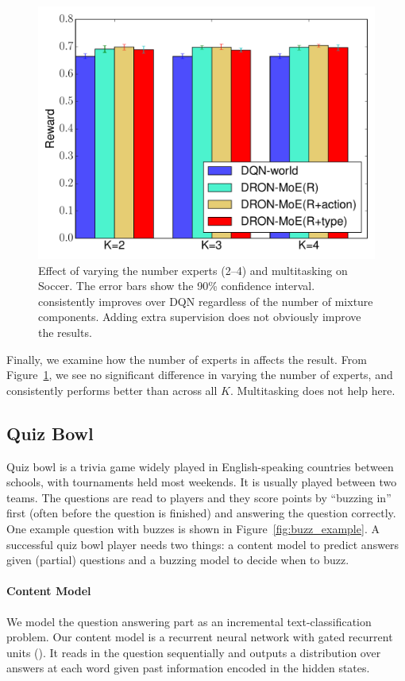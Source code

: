 \begin{figure}[t]
\centering
\includegraphics[width=0.6\linewidth]{2016_icml_opponent/figures/soccer_moe_bar}
\caption{Effect of varying the number experts (2--4) and multitasking on Soccer.
The error bars show the 90\% confidence interval.
\dronmoe{} consistently improves over DQN regardless of the number of mixture components.
Adding extra supervision does not obviously improve the results.
}
\label{fig:soccer_moe_bar}
\end{figure}

Finally, we examine how the number of experts in \dronmoe{} affects
the result. From Figure~\ref{fig:soccer_moe_bar}, we see no
significant difference in varying the number of experts, and
\dronmoe{} consistently performs better than \dqn{} across all $K$.
Multitasking does not help here.

\subsection{Quiz Bowl}

Quiz bowl is a trivia game widely played in English-speaking countries between
schools, with tournaments held most
weekends. It is usually played between two
teams.  The questions are read to players and they score points by ``buzzing in''
first (often before the question is finished) and answering the question
correctly.
One example question with buzzes is shown in Figure~\ref{fig:buzz_example}.
A successful quiz bowl player needs two things: a content
model to predict answers given (partial) questions and a buzzing model to decide
when to buzz.

\paragraph{Content Model}

We model the question answering part as an incremental text-classification
problem.  Our content model is a recurrent neural network with gated recurrent
units (\gru{}).  It reads in the question sequentially and outputs a distribution
over answers at each word given past information encoded in the hidden states.

